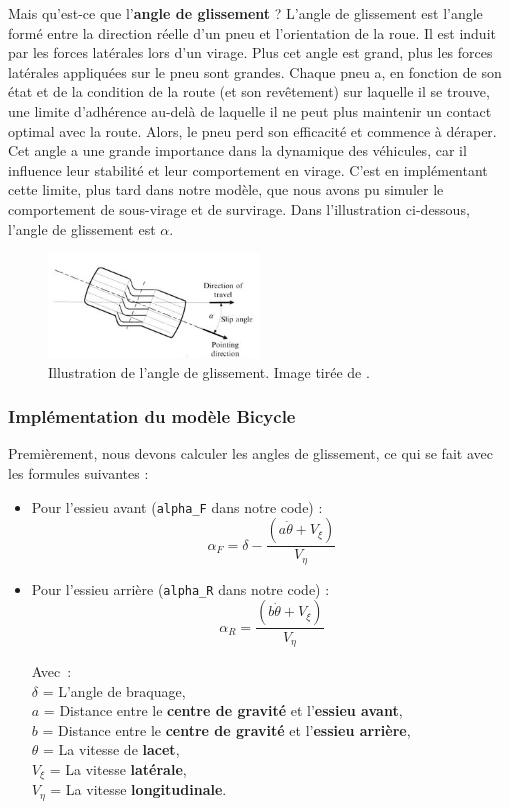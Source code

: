 Mais qu'est-ce que l'\textbf{angle de glissement} ? L'angle de glissement est l'angle formé entre la direction réelle d'un pneu et l'orientation de la roue. Il est induit par les forces latérales lors d'un virage. Plus cet angle est grand, plus les forces latérales appliquées sur le pneu sont grandes. Chaque pneu a, en fonction de son état et de la condition de la route (et son revêtement) sur laquelle il se trouve, une limite d'adhérence au-delà de laquelle il ne peut plus maintenir un contact optimal avec la route. Alors, le pneu perd son efficacité et commence à déraper. Cet angle a une grande importance dans la dynamique des véhicules, car il influence leur stabilité et
leur comportement en virage.
C'est en implémentant cette limite, plus tard dans notre modèle, que nous avons pu simuler le comportement de sous-virage et de survirage.
Dans l'illustration ci-dessous, l'angle de glissement est $\alpha$.
\begin{figure}[h]
    \centering
    \includegraphics[width=0.5\textwidth]{Etape2/slip-angle.jpeg}
    \caption{Illustration de l'angle de glissement. Image tirée de \cite{slip-angle}.}
    \label{fig:bicycle_model}
\end{figure}

\subsubsection{Implémentation du modèle Bicycle}
Premièrement, nous devons calculer les angles de glissement, ce qui se fait avec les formules suivantes :

\begin{itemize}
    \item Pour l'essieu avant (\texttt{alpha\_F} dans notre code) :
    $$\alpha_F = \delta - \frac{(a \dot{\theta}+V_{\xi})}{V_\eta}$$
    \item Pour l'essieu arrière (\texttt{alpha\_R} dans notre code) :
    $$\alpha_R = \frac{(b \dot{\theta}+V_{\xi})}{V_\eta} $$

    Avec :\\
$\delta$ = L'angle de braquage, \\
$a$ = Distance entre le \textbf{centre de gravité} et l'\textbf{essieu avant},\\
$b$ = Distance entre le \textbf{centre de gravité} et l'\textbf{essieu arrière},\\
$\theta$ = La vitesse de \textbf{lacet}, \\
$V_\xi$ = La vitesse \textbf{latérale}, \\
$V_\eta$ = La vitesse \textbf{longitudinale}. \\
\end{itemize}

